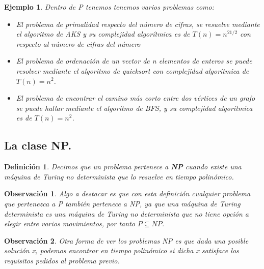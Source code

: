 \documentclass[a4paper,12pt,titlepage]{article}
\newtheorem{defi}{Definici\'on}[section]
\newtheorem{eje}{Ejemplo}[section]
\newtheorem{obs}{Observaci\'on}[section]
\begin{document}
\begin{eje}

Dentro de P tenemos tenemos varios problemas como:

\begin{itemize}
  \item El problema de primalidad respecto del n\'umero de cifras, se resuelve mediante el algoritmo de AKS y su complejidad algor\'itmica es de $T(n) = n^{21/2}$ \cite{aks_complexity} con respecto al n\'umero de cifras del n\'umero
  \item El problema de ordenaci\'on de un vector de n elementos de enteros se puede resolver mediante el algoritmo de quicksort con complejidad algor\'itmica de $T(n) = n^{2}$.
  \item El problema de encontrar el camino m\'as corto entre dos v\'ertices de un grafo se puede hallar mediante el algoritmo de BFS, y su complejidad algor\'itmica es de $T(n) = n^{2}$.
\end{itemize}

\end{eje}

\subsection{La clase NP.}

\begin{defi}

Decimos que un problema pertenece a \textbf{NP} cuando existe una m\'aquina de Turing no determinista que lo resuelve en tiempo polin\'omico.

\end{defi}

\begin{obs}

Algo a destacar es que con esta definici\'on cualquier problema que pertenezca a P tambi\'en pertenece a NP, ya que una m\'aquina de Turing determinista es una m\'aquina de Turing no determinista que no tiene opci\'on a elegir entre varios movimientos, por tanto $P \subseteq NP$.

\end{obs}

\begin{obs}

Otra forma de ver los problemas NP es que dada una posible soluci\'on x, podemos encontrar en tiempo polin\'omico si dicha x satisface los requisitos pedidos al problema previo.

\end {obs}
\end{document}
